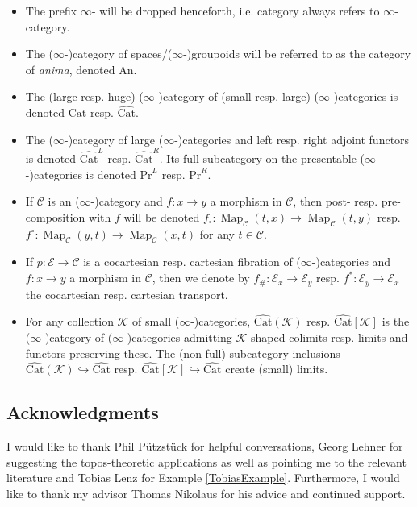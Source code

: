 \documentclass[a4paper,reqno,10pt]{amsart}
\theoremstyle{definition}
\theoremstyle{remark}
\newcommand{\sqb}[1]{\left\lbrack #1\right\rbrack}
\newcommand{\C}{\mathcal{C}}
\newcommand{\E}{\mathcal{E}}
\newcommand{\K}{\mathcal{K}}
\newcommand{\Map}{\operatorname{Map}}
\newcommand{\Cat}{\mathrm{Cat}}
\newcommand{\An}{\mathrm{An}}
\renewcommand{\Pr}{\mathrm{Pr}}
\newcommand{\singlequote}[1]{\textquotesingle #1\textquotesingle}
\begin{document}
\begin{itemize}
\item The prefix \singlequote{$\infty$-} will be dropped henceforth, i.e. \singlequote{category} always refers to $\infty$-category.
\item The ($\infty$-)category of spaces/($\infty$-)groupoids will be referred to as the category of \textit{anima}, denoted $\An$.
\item The (large resp. huge) ($\infty$-)category of (small resp. large) ($\infty$-)categories is denoted $\Cat$ resp. $\widehat{\Cat}$.
\item The ($\infty$-)category of large ($\infty$-)categories and left resp. right adjoint functors is denoted $\widehat{\Cat}^L$ resp. $\widehat{\Cat}^R$. Its full subcategory on the presentable ($\infty$-)categories is denoted $\Pr^L$ resp. $\Pr^R$.
\item If $\C$ is an ($\infty$-)category and $f\colon x\rightarrow y$ a morphism in $\C$, then post- resp. pre-composition with $f$ will be denoted $f_{\circ}\colon\Map_{\C}(t,x)\rightarrow\Map_{\C}(t,y)$ resp. $f^{\circ}\colon\Map_{\C}(y,t)\rightarrow\Map_{\C}(x,t)$ for any $t\in\C$.
\item If $p\colon\E\rightarrow\C$ is a cocartesian resp. cartesian fibration of ($\infty$-)categories and $f\colon x\rightarrow y$ a morphism in $\C$, then we denote by $f_{\#}\colon\E_x\rightarrow\E_y$ resp. $f^{\ast}\colon\E_y\rightarrow\E_x$ the cocartesian resp. cartesian transport.
\item For any collection $\K$ of small ($\infty$-)categories, $\widehat{\Cat}(\K)$ resp. $\widehat{\Cat}\sqb{\K}$ is the ($\infty$-)category of ($\infty$-)categories admitting $\K$-shaped colimits resp. limits and functors preserving these. The (non-full) subcategory inclusions $\widehat{\Cat}(\K)\hookrightarrow\widehat{\Cat}$ resp. $\widehat{\Cat}\sqb{\K}\hookrightarrow\widehat{\Cat}$ create (small) limits.
\end{itemize}

\subsection*{Acknowledgments}

I would like to thank Phil Pützstück for helpful conversations, Georg Lehner for suggesting the topos-theoretic applications as well as pointing me to the relevant literature and Tobias Lenz for Example \ref{TobiasExample}. Furthermore, I would like to thank my advisor Thomas Nikolaus for his advice and continued support.
\end{document}
